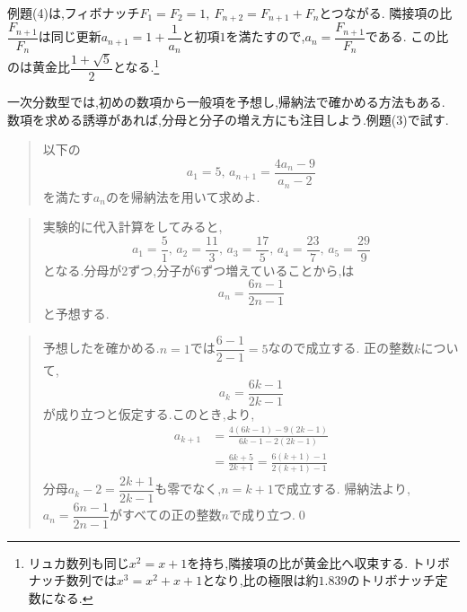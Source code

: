 例題(4)は,フィボナッチ$F_1=F_2=1,\ F_{n+2}=F_{n+1}+F_n$とつながる.
隣接項の比$\dfrac{F_{n+1}}{F_n}$は同じ更新$a_{n+1}=1+\dfrac{1}{a_n}$と初項$1$を満たすので,$a_n=\dfrac{F_{n+1}}{F_n}$である.
この比のは黄金比$\dfrac{1+\sqrt5}{2}$となる.\footnote{リュカ数列も同じ$x^2=x+1$を持ち,隣接項の比が黄金比へ収束する.
  トリボナッチ数列では$x^3=x^2+x+1$となり,比の極限は約$1.839$のトリボナッチ定数になる.}

一次分数型では,初めの数項から一般項を予想し,帰納法で確かめる方法もある.
数項を求める誘導があれば,分母と分子の増え方にも注目しよう.例題(3)で試す.\\
\noindent{}\par\nobreak
\begin{quote}
  以下の
  \[
    a_1=5,\, a_{n+1}=\dfrac{4a_{n}-9}{a_{n}-2}
  \]
  を満たす$a_n$のを帰納法を用いて求めよ.
\end{quote}
\begin{quote}
  実験的に代入計算をしてみると,
  \[
    a_1=\frac{5}{1},\,a_2=\frac{11}{3},\,a_3=\frac{17}{5},\,a_4=\frac{23}{7},\,a_5=\frac{29}{9}
  \]
  となる.分母が2ずつ,分子が6ずつ増えていることから,は
  \[
    a_n=\frac{6n-1}{2n-1}
  \]
  と予想する.
\end{quote}
\begin{quote}
  予想したを確かめる.$n=1$では$\dfrac{6-1}{2-1}=5$なので成立する.
  正の整数$k$について,
  \[
    a_k=\frac{6k-1}{2k-1}
  \]
  が成り立つと仮定する.このとき,より,
  \begin{align*}
    a_{k+1}&=\frac{4(6k-1)-9(2k-1)}{6k-1-2(2k-1)}\\
    &=\frac{6k+5}{2k+1}
    =\frac{6(k+1)-1}{2(k+1)-1}
  \end{align*}
  分母$a_k-2=\dfrac{2k+1}{2k-1}$も零でなく,$n=k+1$で成立する.
  帰納法より,$a_n=\dfrac{6n-1}{2n-1}$がすべての正の整数$n$で成り立つ.\qed

\end{quote}
